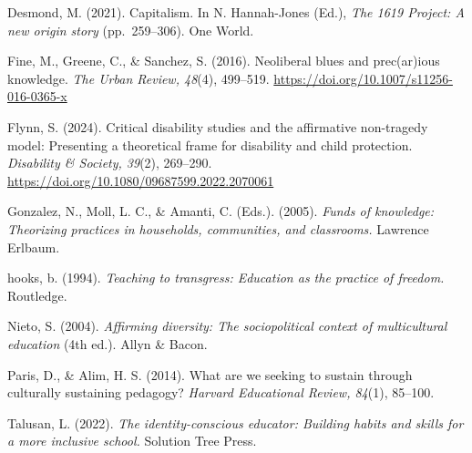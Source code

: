 \documentclass[12pt]{article}
\newcommand{\reference}[1]{\noindent\hangindent=0.5in\hangafter=1 #1\par}
\begin{document}
\reference{Desmond, M. (2021). Capitalism. In N. Hannah-Jones (Ed.), \textit{The 1619 Project: A new origin story} (pp.~259--306). One World.}

\reference{Fine, M., Greene, C., \& Sanchez, S. (2016). Neoliberal blues and prec(ar)ious knowledge. \textit{The Urban Review, 48}(4), 499--519. \url{https://doi.org/10.1007/s11256-016-0365-x}}

\reference{Flynn, S. (2024). Critical disability studies and the affirmative non-tragedy model: Presenting a theoretical frame for disability and child protection. \textit{Disability \& Society, 39}(2), 269--290. \url{https://doi.org/10.1080/09687599.2022.2070061}}

\reference{Gonzalez, N., Moll, L. C., \& Amanti, C. (Eds.). (2005). \textit{Funds of knowledge: Theorizing practices in households, communities, and classrooms.} Lawrence Erlbaum.}

\reference{hooks, b. (1994). \textit{Teaching to transgress: Education as the practice of freedom.} Routledge.}

\reference{Nieto, S. (2004). \textit{Affirming diversity: The sociopolitical context of multicultural education} (4th ed.). Allyn \& Bacon.}

\reference{Paris, D., \& Alim, H. S. (2014). What are we seeking to sustain through culturally sustaining pedagogy? \textit{Harvard Educational Review, 84}(1), 85--100.}

\reference{Talusan, L. (2022). \textit{The identity-conscious educator: Building habits and skills for a more inclusive school.} Solution Tree Press.}
\end{document}
